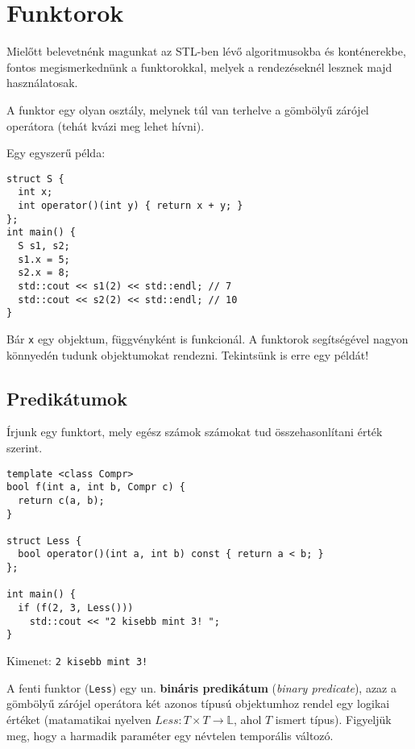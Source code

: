 \documentclass[../cpp_book/cpp_book.tex]{subfiles}
\begin{document}
	\section{Funktorok}
	Mielőtt belevetnénk magunkat az STL-ben lévő algoritmusokba és konténerekbe, fontos megismerkednünk a funktorokkal, melyek a rendezéseknél lesznek majd használatosak.
	\medskip
	
	A funktor egy olyan osztály, melynek túl van terhelve a gömbölyű zárójel operátora (tehát kvázi meg lehet hívni).
	
	\smallskip
	Egy egyszerű példa:
	\begin{lstlisting}
struct S {
  int x;
  int operator()(int y) { return x + y; }
};
int main() {
  S s1, s2;
  s1.x = 5;
  s2.x = 8;
  std::cout << s1(2) << std::endl; // 7
  std::cout << s2(2) << std::endl; // 10
}
	\end{lstlisting}
	Bár \texttt{x} egy objektum, függvényként is funkcionál. A funktorok segítségével nagyon könnyedén tudunk objektumokat rendezni. Tekintsünk is erre egy példát!
	\subsection{Predikátumok}
	Írjunk egy funktort, mely egész számok számokat tud összehasonlítani érték szerint.
	\begin{lstlisting}
template <class Compr>
bool f(int a, int b, Compr c) {
  return c(a, b);
}

struct Less {
  bool operator()(int a, int b) const { return a < b; }
};

int main() {
  if (f(2, 3, Less()))
    std::cout << "2 kisebb mint 3! ";
}
	\end{lstlisting}
	Kimenet: \texttt{2 kisebb mint 3!}
	
	A fenti funktor (\texttt{Less}) egy un. \textbf{bináris predikátum} (\textit{binary predicate}), azaz a gömbölyű zárójel operátora két azonos típusú objektumhoz rendel egy logikai értéket (matamatikai nyelven $Less: T\times T \to \mathbb{L}$, ahol $T$ ismert típus). Figyeljük meg, hogy a harmadik paraméter egy névtelen temporális változó. 
	
\end{document}
